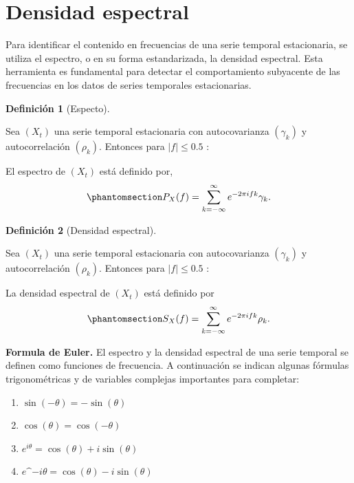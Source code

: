 \documentclass[
  us-letterpaper,
]{scrreprt}
\theoremstyle{plain}
\theoremstyle{definition}
\newtheorem{definition}{Definición}[chapter]
\theoremstyle{definition}
\theoremstyle{remark}
\begin{document}
\section{Densidad espectral}\label{densidad-espectral}

Para identificar el contenido en frecuencias de una serie temporal
estacionaria, se utiliza el espectro, o en su forma estandarizada, la
densidad espectral. Esta herramienta es fundamental para detectar el
comportamiento subyacente de las frecuencias en los datos de series
temporales estacionarias.

\begin{definition}[Especto]\protect\hypertarget{def-espectro}{}\label{def-espectro}

Sea \(( X_t )\) una serie temporal estacionaria con autocovarianza
\(( \gamma_k )\) y autocorrelación \((\rho_k)\). Entonces para
\(|f| \leq 0.5\) :

El espectro de \(( X_t )\) está definido por,
\begin{equation}\phantomsection\label{eq-espectro}{
    P_X(f) = \sum_{k=-\infty}^{\infty} e^{-2\pi ifk} \gamma_k.
}\end{equation}

\end{definition}

\begin{definition}[Densidad
espectral]\protect\hypertarget{def-despectral}{}\label{def-despectral}

Sea \(( X_t )\) una serie temporal estacionaria con autocovarianza
\(( \gamma_k )\) y autocorrelación \(( \rho_k )\). Entonces para
\(|f| \leq 0.5\) :

La densidad espectral de \(( X_t )\) está definido por
\begin{equation}\phantomsection\label{eq-despectral}{
    S_X(f) = \sum_{k=-\infty}^{\infty} e^{-2\pi ifk} \rho_k.
}\end{equation}

\end{definition}

\textbf{Formula de Euler.} El espectro y la densidad espectral de una
serie temporal se definen como funciones de frecuencia. A continuación
se indican algunas fórmulas trigonométricas y de variables complejas
importantes para completar:

\begin{enumerate}
\def\labelenumi{\alph{enumi})}
\item
  \(\sin(- \theta) = - \sin (\theta)\)
\item
  \(\cos( \theta) = \cos (- \theta)\)
\item
  \(e^{i \theta} = \cos (\theta) + i \sin (\theta)\)
\item
  \(e\^{-i \theta} = \cos (\theta) - i \sin (\theta)\)
\end{enumerate}
\end{document}
